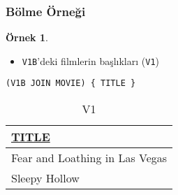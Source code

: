 \documentclass[dvipsnames]{beamer}
\theoremstyle{definition}
\theoremstyle{example}
\newtheorem{ornek}[theorem]{Örnek}
\theoremstyle{plain}
\begin{document}
\begin{frame}[fragile]
  \frametitle{Bölme Örneği}

  \begin{ornek}
    \begin{itemize}
      \item \texttt{V1B}'deki filmlerin başlıkları (\texttt{V1})
    \end{itemize}

    \begin{lstlisting}
(V1B JOIN MOVIE) { TITLE }
    \end{lstlisting}

    \pause
    \vspace{-10pt}
    \begin{tiny}
    \begin{table}
      \caption{V1}
      \begin{tabular}{|l|}\hline
\underline{TITLE}             \\[2pt]\hline\hline
Fear and Loathing in Las Vegas\\\hline
Sleepy Hollow                 \\\hline
      \end{tabular}
    \end{table}
    \end{tiny}
  \end{ornek}
\end{frame}
% 
% 
% 
\end{document}
